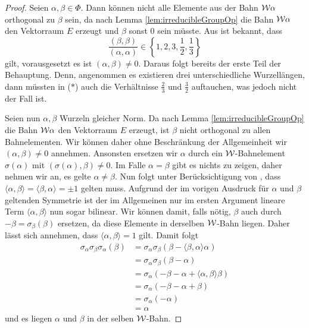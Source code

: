 \begin{proof}
  Seien $\alpha, \beta \in \Phi$.
  Dann können nicht alle Elemente aus der Bahn $\mathcal{W}\alpha$ orthogonal zu $\beta$ sein, da nach Lemma \ref{lem:irreducibleGroupOp} die Bahn $\mathcal{W}\alpha$ den Vektorraum $E$ erzeugt und $\beta$ sonst $0$ sein müsste.
  Aus \cite[S.45]{humphreys1972introduction} ist bekannt, dass  
  \begin{displaymath}
    \frac{(\beta,\beta)}{(\alpha,\alpha)} \in \left\{1,2,3,\frac{1}{2},\frac{1}{3}\right\} \tag{$\ast$}
  \end{displaymath}
  gilt, vorausgesetzt es ist $(\alpha, \beta) \neq 0$.
  Daraus folgt bereits der erste Teil der Behauptung.
  Denn, angenommen es existieren drei unterschiedliche Wurzellängen, dann müssten in ($\ast$) auch die Verhältnisse $\tfrac{2}{3}$ und $\tfrac{3}{2}$ auftauchen, was jedoch nicht der Fall ist.

  Seien nun $\alpha, \beta$ Wurzeln gleicher Norm.
  Da nach Lemma \ref{lem:irreducibleGroupOp} die Bahn $\mathcal{W}\alpha$ den Vektorraum $E$ erzeugt, ist $\beta$ nicht orthogonal zu allen Bahnelementen.
  Wir können daher ohne Beschränkung der Allgemeinheit wir $(\alpha, \beta) \neq 0$ annehmen.
  Ansonsten ersetzen wir $\alpha$ durch ein $\mathcal{W}$\hyp{}Bahnelement $\sigma(\alpha)$ mit $(\sigma(\alpha), \beta) \neq 0$.
  Im Falle $\alpha = \beta$ gibt es nichts zu zeigen, daher nehmen wir an, es gelte $\alpha \neq \beta$.
  Nun folgt unter Berücksichtigung von \cite[S.45]{humphreys1972introduction}, dass $\langle \alpha, \beta \rangle = \langle \beta, \alpha \rangle = \pm 1$ gelten muss.
  Aufgrund der im vorigen Ausdruck für $\alpha$ und $\beta$ geltenden Symmetrie ist der im Allgemeinen nur im ersten Argument lineare Term $\langle \alpha, \beta \rangle$ nun sogar bilinear.
  Wir können damit, falls nötig, $\beta$ auch durch $-\beta = \sigma_\beta(\beta)$ ersetzen, da diese Elemente in derselben $\mathcal{W}$\hyp{}Bahn liegen.
  Daher lässt sich annehmen, dass $\langle \alpha, \beta \rangle = 1$ gilt.
  Damit folgt
  \begin{align*}
    \sigma_\alpha \sigma_\beta \sigma_\alpha(\beta) 
    &= \sigma_\alpha \sigma_\beta(\beta - \langle \beta, \alpha \rangle \alpha) \\
    &= \sigma_\alpha \sigma_\beta(\beta - \alpha) \\
    &= \sigma_\alpha (-\beta - \alpha + \langle \alpha, \beta \rangle \beta) \\
    &= \sigma_\alpha (-\beta - \alpha + \beta) \\
    &= \sigma_\alpha (-\alpha) \\
    &= \alpha
  \end{align*}
  und es liegen $\alpha$ und $\beta$ in der selben $\mathcal{W}$\hyp{}Bahn.
\end{proof} 

